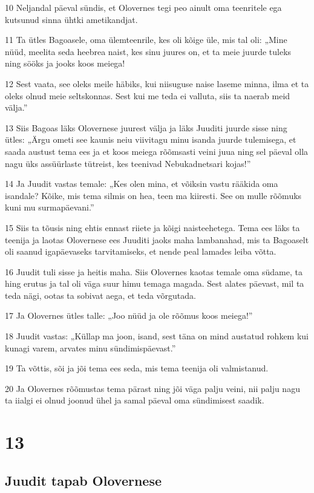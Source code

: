 \par 10 Neljandal päeval sündis, et Olovernes tegi peo ainult oma teenritele ega kutsunud sinna ühtki ametikandjat.
\par 11 Ta ütles Bagoasele, oma ülemteenrile, kes oli kõige üle, mis tal oli: „Mine nüüd, meelita seda heebrea naist, kes sinu juures on, et ta meie juurde tuleks ning sööks ja jooks koos meiega!
\par 12 Sest vaata, see oleks meile häbiks, kui niisuguse naise laseme minna, ilma et ta oleks olnud meie seltskonnas. Sest kui me teda ei valluta, siis ta naerab meid välja.”
\par 13 Siis Bagoas läks Olovernese juurest välja ja läks Juuditi juurde sisse ning ütles: „Ärgu ometi see kaunis neiu viivitagu minu isanda juurde tulemisega, et saada austust tema ees ja et koos meiega rõõmsasti veini juua ning sel päeval olla nagu üks assüürlaste tütreist, kes teenivad Nebukadnetsari kojas!”
\par 14 Ja Juudit vastas temale: „Kes olen mina, et võiksin vastu rääkida oma isandale? Kõike, mis tema silmis on hea, teen ma kiiresti. See on mulle rõõmuks kuni mu surmapäevani.”
\par 15 Siis ta tõusis ning ehtis ennast riiete ja kõigi naisteehetega. Tema ees läks ta teenija ja laotas Olovernese ees Juuditi jaoks maha lambanahad, mis ta Bagoaselt oli saanud igapäevaseks tarvitamiseks, et nende peal lamades leiba võtta.
\par 16 Juudit tuli sisse ja heitis maha. Siis Olovernes kaotas temale oma südame, ta hing erutus ja tal oli väga suur himu temaga magada. Sest alates päevast, mil ta teda nägi, ootas ta sobivat aega, et teda võrgutada.
\par 17 Ja Olovernes ütles talle: „Joo nüüd ja ole rõõmus koos meiega!”
\par 18 Juudit vastas: „Küllap ma joon, isand, sest täna on mind austatud rohkem kui kunagi varem, arvates minu sündimispäevast.”
\par 19 Ta võttis, sõi ja jõi tema ees seda, mis tema teenija oli valmistanud.
\par 20 Ja Olovernes rõõmustas tema pärast ning jõi väga palju veini, nii palju nagu ta iialgi ei olnud joonud ühel ja samal päeval oma sündimisest saadik.


\chapter{13}

\section*{Juudit tapab Olovernese}

